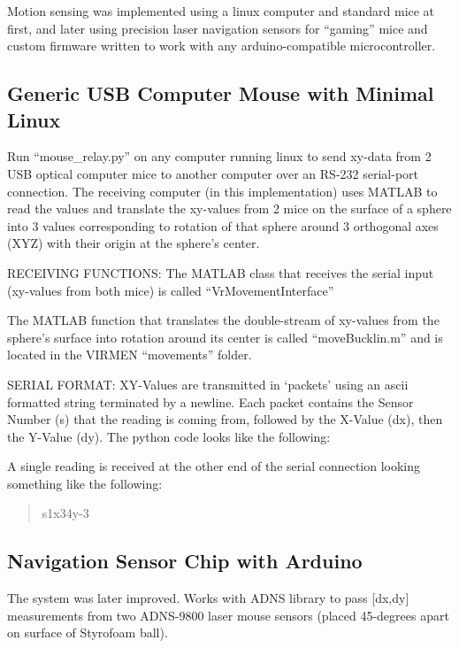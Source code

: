 Motion sensing was implemented using a linux computer and standard mice at first, and later using precision laser navigation sensors for ``gaming'' mice and custom firmware written to work with any arduino-compatible microcontroller.

\subsection{
	Generic USB Computer Mouse with Minimal Linux}\label{generic-usb-computer-mouse-with-minimal-linux} 

Run ``mouse\_relay.py'' on any computer running linux to send xy-data from 2 USB optical computer mice to another computer over an RS-232 serial-port connection.
The receiving computer (in this implementation) uses MATLAB to read the values and translate the xy-values from 2 mice on the surface of a sphere into 3 values corresponding to rotation of that sphere around 3 orthogonal axes (XYZ) with their origin at the sphere's center.

RECEIVING FUNCTIONS: The MATLAB class that receives the serial input (xy-values from both mice) is called ``VrMovementInterface'' 

The MATLAB function that translates the double-stream of xy-values from the sphere's surface into rotation around its center is called ``moveBucklin.m'' and is located in the VIRMEN ``movements'' folder.

SERIAL FORMAT: XY-Values are transmitted in `packets' using an ascii formatted string terminated by a newline.
Each packet contains the Sensor Number (s) that the reading is coming from, followed by the X-Value (dx), then the Y-Value (dy).
The python code looks like the following: 

A single reading is received at the other end of the serial connection looking something like the following: 

\begin{quote}
	s1x34y-3
\end{quote}

\subsection{Navigation Sensor Chip with Arduino}\label{navigation-sensor-chip-with-arduino} 

The system was later improved.
Works with ADNS library to pass {[}dx,dy{]} measurements from two ADNS-9800 laser mouse sensors (placed 45-degrees apart on surface of Styrofoam ball).

